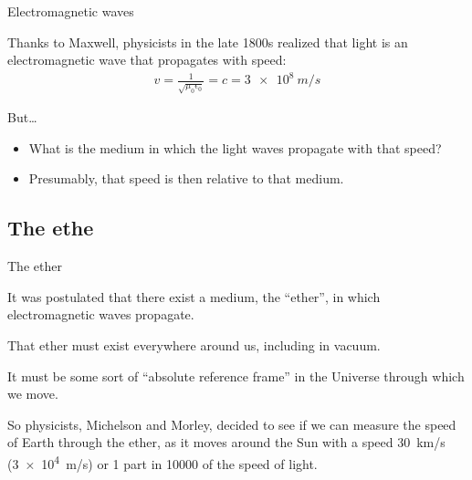 \documentclass[aspectratio=169,
hyperref={colorlinks,urlcolor=blue}
]{beamer}
\begin{document}
\begin{bulletframe}{Electromagnetic waves}
\item Thanks to Maxwell, physicists in the late 1800s realized that light is an electromagnetic wave that propagates with speed:
\begin{align*}
v=\frac{1}{\sqrt{\mu_0\epsilon_0}}=c=\SI{3e8}{m/s}
\end{align*}
\item But…
\begin{itemize}
\item What is the medium in which the light waves propagate with that speed?
\item Presumably, that speed is then relative to that medium.
\end{itemize}
\end{bulletframe}



\subsection{The ethe}
\label{subsec:theether}
\begin{bulletframe}{The ether}
\item It was postulated that there exist a medium, the ``ether'', in which electromagnetic waves propagate.
\item That ether must exist everywhere around us, including in vacuum.
\item It must be some sort of ``absolute reference frame'' in the Universe through which we move.
\item So physicists, Michelson and Morley, decided to see if we can measure the speed of Earth through the ether, as it moves around the Sun with a speed \SI{30}{km/s} (\SI{3e4}{m/s}) or 1 part in \num{10000} of the speed of light.
\end{bulletframe}
\end{document}
